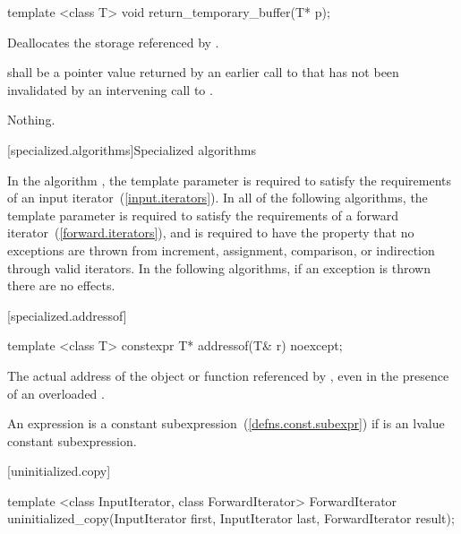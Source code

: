 %
\begin{itemdecl}
template <class T> void return_temporary_buffer(T* p);
\end{itemdecl}

\begin{itemdescr}
\pnum
\effects
Deallocates the storage referenced by .

\pnum
\requires
{} shall be a pointer value returned by an earlier call to
 that has not been invalidated by
an intervening call to .

\pnum
\throws
Nothing.
\end{itemdescr}

[specialized.algorithms]{Specialized algorithms}

\pnum
In the algorithm , the template parameter
 is required to satisfy the requirements of an input
iterator~(\ref{input.iterators}). In all of the following algorithms,
the template parameter  is required to satisfy the
requirements of a forward iterator~(\ref{forward.iterators}),
and is required to have the property that no exceptions are thrown
from increment, assignment, comparison, or indirection through valid iterators.
In the following algorithms, if an exception is thrown there are no effects.

[specialized.addressof]{}

%
\begin{itemdecl}
template <class T> constexpr T* addressof(T& r) noexcept;
\end{itemdecl}

\begin{itemdescr}
\pnum
\returns The actual address of the object or function referenced by , even in the
presence of an overloaded .

\pnum
\remarks An expression 
is a constant subexpression~(\ref{defns.const.subexpr})
if  is an lvalue constant subexpression.
\end{itemdescr}


[uninitialized.copy]{}

%
\begin{itemdecl}
template <class InputIterator, class ForwardIterator>
  ForwardIterator uninitialized_copy(InputIterator first, InputIterator last,
                                     ForwardIterator result);
\end{itemdecl}

